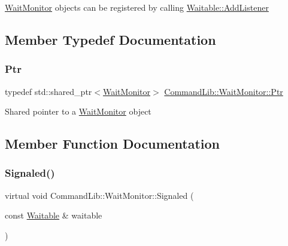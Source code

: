 \mbox{\hyperlink{class_command_lib_1_1_wait_monitor}{Wait\+Monitor}} objects can be registered by calling \mbox{\hyperlink{class_command_lib_1_1_waitable_afa4d25c0eb13db4222575f95036fbb22}{Waitable\+::\+Add\+Listener}}

\subsection{Member Typedef Documentation}
\mbox{\label{class_command_lib_1_1_wait_monitor_ae97f385185f20d67f215494278136052}} 
\subsubsection{\texorpdfstring{Ptr}{Ptr}}
{\footnotesize\ttfamily typedef std\+::shared\+\_\+ptr$<$\mbox{\hyperlink{class_command_lib_1_1_wait_monitor}{Wait\+Monitor}}$>$ \mbox{\hyperlink{class_command_lib_1_1_wait_monitor_ae97f385185f20d67f215494278136052}{Command\+Lib\+::\+Wait\+Monitor\+::\+Ptr}}}



Shared pointer to a \mbox{\hyperlink{class_command_lib_1_1_wait_monitor}{Wait\+Monitor}} object



\subsection{Member Function Documentation}
\mbox{\label{class_command_lib_1_1_wait_monitor_a478cc2d9cc714ecb9b4844e47a67faa1}} 
\subsubsection{\texorpdfstring{Signaled()}{Signaled()}}
{\footnotesize\ttfamily virtual void Command\+Lib\+::\+Wait\+Monitor\+::\+Signaled (\begin{DoxyParamCaption}\item[{const \mbox{\hyperlink{class_command_lib_1_1_waitable}{Waitable}} \&}]{waitable }\end{DoxyParamCaption})\hspace{0.3cm}{\ttfamily [pure virtual]}}



